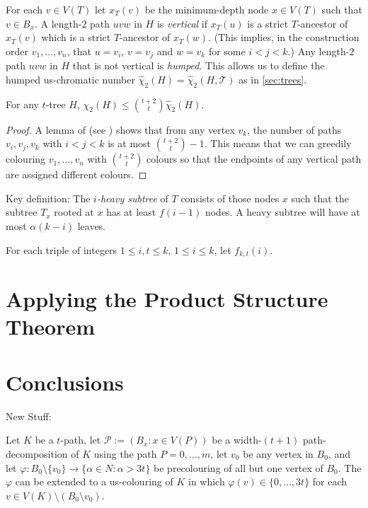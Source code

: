 \documentclass[kpfonts]{patmorin}
\newcommand{\uqs}{\chi_2}
\newcommand{\hus}{\hat{\chi}_2}
\begin{document}
For each $v\in V(T)$ let $x_T(v)$ be the minimum-depth node $x\in V(T)$ such that $v\in B_x$.  A length-$2$ path $uvw$ in $H$ is \emph{vertical} if $x_T(u)$ is a strict $T$-ancestor of $x_T(v)$ which is a strict $T$-ancestor of $x_T(w)$. (This implies, in the construction order $v_1,\ldots,v_n$, that $u=v_i$, $v=v_j$ and $w=v_k$ for some $i<j<k$.) Any length-$2$ path $uvw$ in $H$ that is not vertical is \emph{humped}.  This allows us to define the humped us-chromatic number $\hus(H)=\hus(H,\mathcal{T})$ as in \cref{sec:trees}.

\begin{lem}
    For any $t$-tree $H$, $\uqs(H)\le \binom{t+2}{t}\hus(H)$.
\end{lem}

\begin{proof}
    A lemma of \citet{pilipczuk.siebertz:polynomial} (see \cite[Lemma~13]{pilipczuk.siebertz.polynomial-arxiv}) shows that from any vertex $v_k$, the number of paths $v_i,v_j,v_k$ with $i<j<k$ is at most $\binom{t+2}{t}-1$.  This means that we can greedily colouring $v_1,\ldots,v_n$ with $\binom{t+2}{t}$ colours so that the endpoints of any vertical path are assigned different colours.
\end{proof}

Key definition:  The \emph{$i$-heavy subtree} of $T$ consists of those nodes $x$ such that the subtree $T_x$ rooted at $x$ has at least $f(i-1)$ nodes.  A heavy subtree will have at most $\alpha(k-i)$ leaves.


For each triple of integers $1\le i,t \le k$, $1\le i\le k$, let $f_{k,t}(i)$.



\section{Applying the Product Structure Theorem}


\section{Conclusions}

New Stuff:

\begin{lem}\label{path-colour}
    Let $K$ be a $t$-path, let $\mathcal{P}:=(B_x:x\in V(P))$ be a width-$(t+1)$ path-decomposition of $K$ using the path $P=0,\ldots,m$, let $v_0$ be any vertex in $B_0$, and let $\varphi:B_{0}\setminus\{v_0\}\to\{\alpha\in N:\alpha > 3t\}$ be precolouring of all but one vertex of $B_{0}$.  The $\varphi$ can be extended to a us-colouring of $K$ in which $\varphi(v)\in\{0,\ldots,3t\}$ for each $v\in V(K)\setminus (B_0\setminus v_0)$.
\end{lem}
\end{document}

